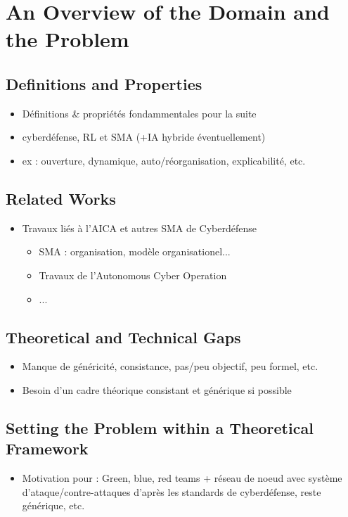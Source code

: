 \chapter{An Overview of the Domain and the Problem}\label{ch:domain_problem}

\section{Definitions and Properties}
\begin{itemize}

    \item Définitions \& propriétés fondammentales pour la suite
    \item cyberdéfense, RL et SMA (+IA hybride éventuellement)
    \item ex : ouverture, dynamique, auto/réorganisation, explicabilité, etc.
\end{itemize}

\section{Related Works}
\begin{itemize}
    \item Travaux liés à l’AICA et autres SMA de Cyberdéfense
          \begin{itemize}
              \item SMA : organisation, modèle organisationel...
              \item Travaux de l'Autonomous Cyber Operation
              \item ...
          \end{itemize}
\end{itemize}

\section{Theoretical and Technical Gaps}
\begin{itemize}
    \item Manque de généricité, consistance, pas/peu objectif, peu formel, etc.
    \item Besoin d’un cadre théorique consistant et générique si possible
\end{itemize}

\section{Setting the Problem within a Theoretical Framework}
\begin{itemize}
    \item Motivation pour : Green, blue, red teams + réseau de noeud avec système d’ataque/contre-attaques d’après les standards de cyberdéfense, reste générique, etc.
\end{itemize}

